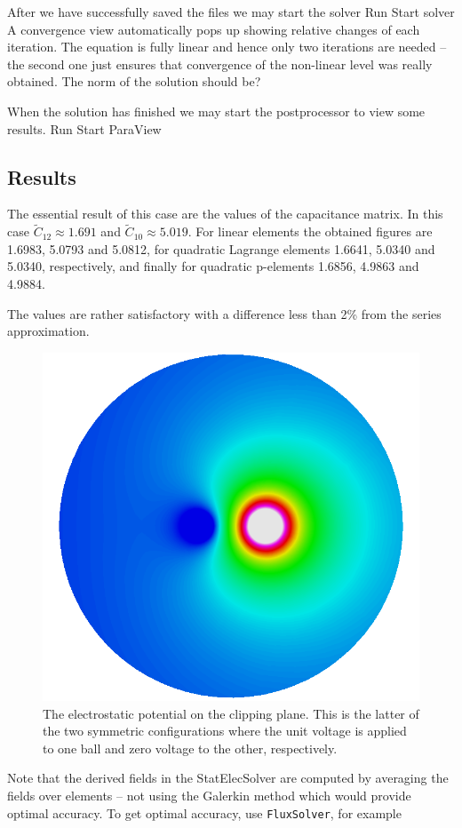 After we have successfully saved the files we may start the solver
\ttbegin
Run
  Start solver
\ttend
A convergence view automatically pops up showing relative changes of each iteration.
The equation is fully linear and hence only two iterations are needed -- the second 
one just ensures that convergence of the non-linear level was really obtained. 
The norm of the solution should be?

When the solution has finished we may start the postprocessor to view some results.
\ttbegin
Run
  Start ParaView
\ttend


\subsection*{Results}

The essential result of this case are the values of the capacitance matrix.
In this case $\tilde{C}_{12} \approx 1.691$ and $\tilde{C}_{10} \approx 5.019$.
For linear elements the obtained figures are 1.6983, 5.0793 and 5.0812, 
for quadratic Lagrange elements 1.6641, 5.0340 and 5.0340, respectively, and
finally for quadratic p-elements 1.6856, 4.9863 and 4.9884. 

The values are rather satisfactory with a difference less than 2\% from the series approximation.


\begin{figure}[h]
\centering
\includegraphics[width=120 mm]{ElmerPost_capture2}
\caption{The electrostatic potential on the clipping plane. This is the latter of the two symmetric configurations where the
unit voltage is applied to one ball and zero voltage to the other, respectively.}\label{fg:ballspost}
\end{figure}  

Note that the derived fields in the StatElecSolver are computed 
by averaging the fields over elements -- not using the 
Galerkin method which would provide optimal accuracy. To get optimal accuracy, use 
\texttt{FluxSolver}, for example


\hfill



